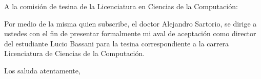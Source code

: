 \documentclass[11pt]{letter}
\date{Rosario, 9 de octubre de 2023}
\begin{document}
\begin{letter}{}
\opening{A la comisión de tesina de la Licenciatura en Ciencias de la Computación:}

Por medio de la misma quien subscribe, el doctor Alejandro Sartorio, se dirige a ustedes con el fin de presentar formalmente mi aval de aceptación como director del estudiante Lucio Bassani para la tesina correspondiente a la carrera Licenciatura de Ciencias de la Computación.

\closing{ Los saluda atentamente,}
\end{letter}
\end{document}
